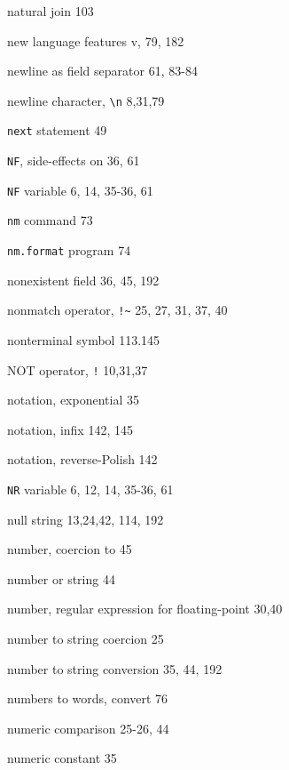 \begin{multicols}{3}
\hangindent=3pc  natural join 103

\hangindent=3pc  new language features v, 79, 182

\hangindent=3pc  newline as field separator 61,  83-84

\hangindent=3pc  newline character, \verb'\n' 8,31,79

\hangindent=3pc  \verb'next' statement 49

\hangindent=3pc  \verb'NF', side-effects on 36, 61

\hangindent=3pc  \verb'NF' variable 6, 14, 35-36, 61

\hangindent=3pc  \verb'nm' command 73

\hangindent=3pc  \verb'nm.format' program 74


\hangindent=3pc  nonexistent field 36, 45, 192

\hangindent=3pc  nonmatch operator, \verb'!~' 25, 27, 31, 37, 40

\hangindent=3pc  nonterminal symbol 113.145

\hangindent=3pc  NOT operator, \verb'!' 10,31,37

\hangindent=3pc  notation, exponential 35

\hangindent=3pc  notation, infix 142, 145

\hangindent=3pc  notation, reverse-Polish 142

\hangindent=3pc  \verb'NR' variable 6, 12, 14, 35-36, 61

\hangindent=3pc  null string 13,24,42, 114, 192

\hangindent=3pc  number, coercion to 45

\hangindent=3pc  number or string 44

\hangindent=3pc  number, regular expression for floating-point 30,40

\hangindent=3pc  number to string coercion 25

\hangindent=3pc  number to string conversion 35,  44, 192

\hangindent=3pc  numbers to words, convert 76

\hangindent=3pc  numeric comparison 25-26, 44

\hangindent=3pc  numeric constant 35


\end{multicols}
